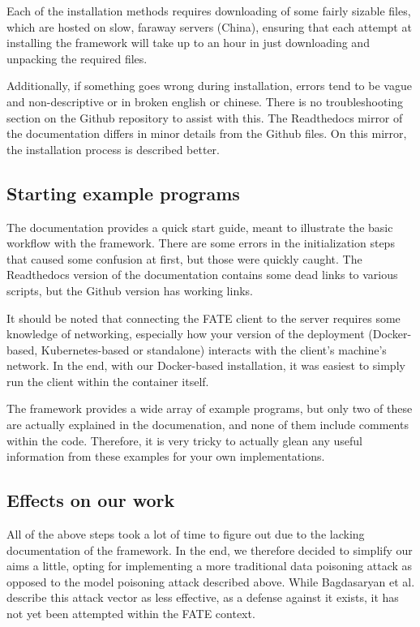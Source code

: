 \documentclass{article}
\begin{document}
\par Each of the installation methods requires downloading of some fairly sizable files, which are hosted on slow, faraway servers (China), ensuring that each attempt at installing the framework will take up to an hour in just downloading and unpacking the required files.

Additionally, if something goes wrong during installation, errors tend to be vague and non-descriptive or in broken english or chinese. There is no troubleshooting section on the Github repository to assist with this. The Readthedocs mirror of the documentation differs in minor details from the Github files. On this mirror, the installation process is described better.

\subsection{Starting example programs}
The documentation provides a quick start guide, meant to illustrate the basic workflow with the framework. There are some errors in the initialization steps that caused some confusion at first, but those were quickly caught. The Readthedocs version of the documentation contains some dead links to various scripts, but the Github version has working links.

It should be noted that connecting the FATE client to the server requires some knowledge of networking, especially how your version of the deployment (Docker-based, Kubernetes-based or standalone) interacts with the client's machine's network. In the end, with our Docker-based installation, it was easiest to simply run the client within the container itself.

The framework provides a wide array of example programs, but only two of these are actually explained in the documenation, and none of them include comments within the code. Therefore, it is very tricky to actually glean any useful information from these examples for your own implementations.

\subsection{Effects on our work}
All of the above steps took a lot of time to figure out due to the lacking documentation of the framework. In the end, we therefore decided to simplify our aims a little, opting for implementing a more traditional data poisoning attack as opposed to the model poisoning attack described above. While Bagdasaryan et al. \cite{DBLP:journals/corr/abs-1807-00459} describe this attack vector as less effective, as a defense against it exists, it has not yet been attempted within the FATE context.
\end{document}
